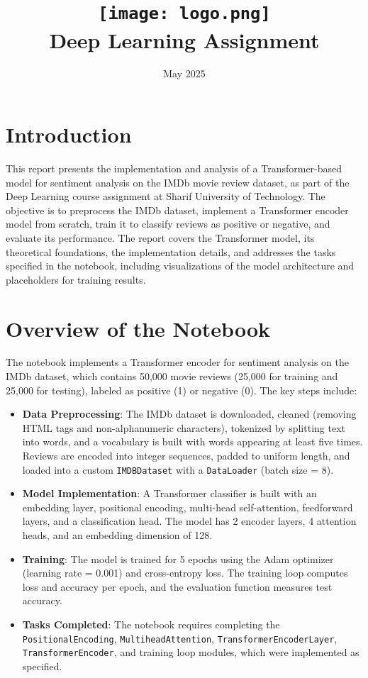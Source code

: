 \documentclass{article}
\title{
    \texttt{[image: logo.png]} \\
    Deep Learning Assignment \\ \exerciseset
}
\author{\FirstAuthor}
\date{May 2025}
\begin{document}
\maketitle

\section*{Introduction}
This report presents the implementation and analysis of a Transformer-based model for sentiment analysis on the IMDb movie review dataset, as part of the Deep Learning course assignment at Sharif University of Technology. The objective is to preprocess the IMDb dataset, implement a Transformer encoder model from scratch, train it to classify reviews as positive or negative, and evaluate its performance. The report covers the Transformer model, its theoretical foundations, the implementation details, and addresses the tasks specified in the notebook, including visualizations of the model architecture and placeholders for training results.

\section{Overview of the Notebook}
The notebook implements a Transformer encoder for sentiment analysis on the IMDb dataset, which contains 50,000 movie reviews (25,000 for training and 25,000 for testing), labeled as positive (1) or negative (0). The key steps include:

\begin{itemize}
    \item \textbf{Data Preprocessing}: The IMDb dataset is downloaded, cleaned (removing HTML tags and non-alphanumeric characters), tokenized by splitting text into words, and a vocabulary is built with words appearing at least five times. Reviews are encoded into integer sequences, padded to uniform length, and loaded into a custom \texttt{IMDBDataset} with a \texttt{DataLoader} (batch size = 8).
    \item \textbf{Model Implementation}: A Transformer classifier is built with an embedding layer, positional encoding, multi-head self-attention, feedforward layers, and a classification head. The model has 2 encoder layers, 4 attention heads, and an embedding dimension of 128.
    \item \textbf{Training}: The model is trained for 5 epochs using the Adam optimizer (learning rate = 0.001) and cross-entropy loss. The training loop computes loss and accuracy per epoch, and the evaluation function measures test accuracy.
    \item \textbf{Tasks Completed}: The notebook requires completing the \texttt{PositionalEncoding}, \texttt{MultiheadAttention}, \texttt{TransformerEncoderLayer}, \texttt{TransformerEncoder}, and training loop modules, which were implemented as specified.
\end{itemize}
\end{document}
